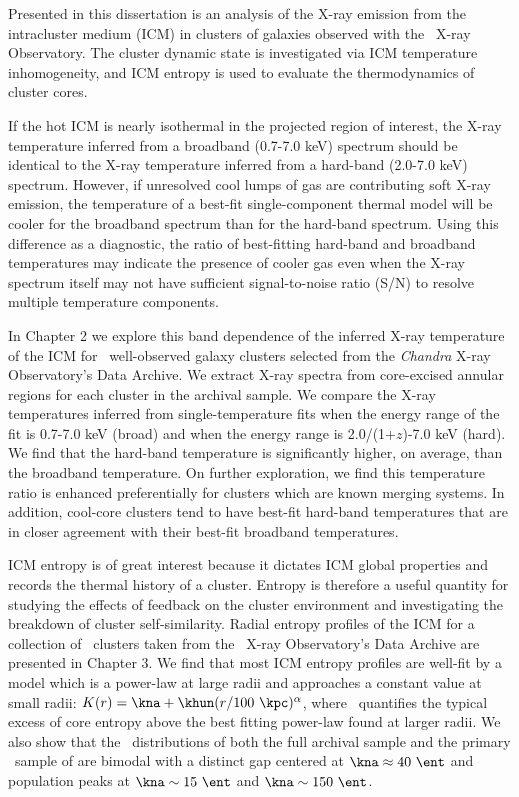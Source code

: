 \documentclass[11pt]{article}
\begin{document}
Presented in this dissertation is an analysis of the X-ray emission
from the intracluster medium (ICM) in clusters of galaxies observed
with the \chandra\ X-ray Observatory. The cluster dynamic state is
investigated via ICM temperature inhomogeneity, and ICM entropy is
used to evaluate the thermodynamics of cluster cores.

If the hot ICM is nearly isothermal in the projected region of
interest, the X-ray temperature inferred from a broadband (0.7-7.0
keV) spectrum should be identical to the X-ray temperature inferred
from a hard-band (2.0-7.0 keV) spectrum. However, if unresolved cool
lumps of gas are contributing soft X-ray emission, the temperature of
a best-fit single-component thermal model will be cooler for the
broadband spectrum than for the hard-band spectrum. Using this
difference as a diagnostic, the ratio of best-fitting hard-band and
broadband temperatures may indicate the presence of cooler gas even
when the X-ray spectrum itself may not have sufficient signal-to-noise
ratio (S/N) to resolve multiple temperature components.

In Chapter 2 we explore this band dependence of the inferred X-ray
temperature of the ICM for \ebandnuma\ well-observed galaxy clusters
selected from the {\it Chandra} X-ray Observatory's Data Archive. We
extract X-ray spectra from core-excised annular regions for each
cluster in the archival sample. We compare the X-ray temperatures
inferred from single-temperature fits when the energy range of the fit
is 0.7-7.0 keV (broad) and when the energy range is 2.0/(1+$z$)-7.0
keV (hard). We find that the hard-band temperature is significantly
higher, on average, than the broadband temperature. On further
exploration, we find this temperature ratio is enhanced preferentially
for clusters which are known merging systems. In addition, cool-core
clusters tend to have best-fit hard-band temperatures that are in
closer agreement with their best-fit broadband temperatures.

ICM entropy is of great interest because it dictates ICM global
properties and records the thermal history of a cluster. Entropy is
therefore a useful quantity for studying the effects of feedback on
the cluster environment and investigating the breakdown of cluster
self-similarity. Radial entropy profiles of the ICM for a collection
of \entsuppnum\ clusters taken from the \chandra\ X-ray Observatory's
Data Archive are presented in Chapter 3. We find that most ICM entropy
profiles are well-fit by a model which is a power-law at large radii
and approaches a constant value at small radii: $K(r) =
\kna + \khun (r/100 ~\kpc)^{\alpha}$, where \kna\ quantifies the
typical excess of core entropy above the best fitting power-law found
at larger radii. We also show that the \kna\ distributions of both the
full archival sample and the primary \hifl\ sample of
\cite{hiflugcs1} are bimodal with a distinct gap centered at $\kna
\approx 40 ~\ent$ and population peaks at $\kna \sim 15 ~\ent$ and $\kna
\sim 150 ~\ent$.
\end{document}
